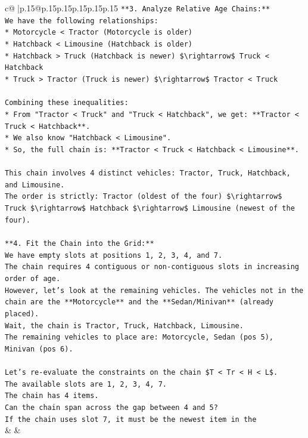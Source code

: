 \documentclass{article}
\begin{document}
{\begin{supertabular}{c@{$\;$}|p{.15\linewidth}@{}p{.15\linewidth}p{.15\linewidth}p{.15\linewidth}p{.15\linewidth}p{.15\linewidth}}
{{{\texttt{**3. Analyze Relative Age Chains:**} \\
\texttt{We have the following relationships:} \\
\texttt{*   Motorcycle < Tractor (Motorcycle is older)} \\
\texttt{*   Hatchback < Limousine (Hatchback is older)} \\
\texttt{*   Hatchback > Truck (Hatchback is newer) \$\textbackslash{}rightarrow\$ Truck < Hatchback} \\
\texttt{*   Truck > Tractor (Truck is newer) \$\textbackslash{}rightarrow\$ Tractor < Truck} \\
\\ 
\texttt{Combining these inequalities:} \\
\texttt{*   From "Tractor < Truck" and "Truck < Hatchback", we get: **Tractor < Truck < Hatchback**.} \\
\texttt{*   We also know "Hatchback < Limousine".} \\
\texttt{*   So, the full chain is: **Tractor < Truck < Hatchback < Limousine**.} \\
\\ 
\texttt{This chain involves 4 distinct vehicles: Tractor, Truck, Hatchback, and Limousine.} \\
\texttt{The order is strictly: Tractor (oldest of the four) \$\textbackslash{}rightarrow\$ Truck \$\textbackslash{}rightarrow\$ Hatchback \$\textbackslash{}rightarrow\$ Limousine (newest of the four).} \\
\\ 
\texttt{**4. Fit the Chain into the Grid:**} \\
\texttt{We have empty slots at positions 1, 2, 3, 4, and 7.} \\
\texttt{The chain requires 4 contiguous or non{-}contiguous slots in increasing order of age.} \\
\texttt{However, let's look at the remaining vehicles. The vehicles not in the chain are the **Motorcycle** and the **Sedan/Minivan** (already placed).} \\
\texttt{Wait, the chain is Tractor, Truck, Hatchback, Limousine.} \\
\texttt{The remaining vehicles to place are: Motorcycle, Sedan (pos 5), Minivan (pos 6).} \\
\\ 
\texttt{Let's re{-}evaluate the constraints on the chain \$T < Tr < H < L\$.} \\
\texttt{The available slots are 1, 2, 3, 4, 7.} \\
\texttt{The chain has 4 items.} \\
\texttt{Can the chain span across the gap between 4 and 5?} \\
\texttt{If the chain uses slot 7, it must be the newest item in the} \\
            }
        }
    }
    & & \\ \\


\end{supertabular}}
\end{document}
